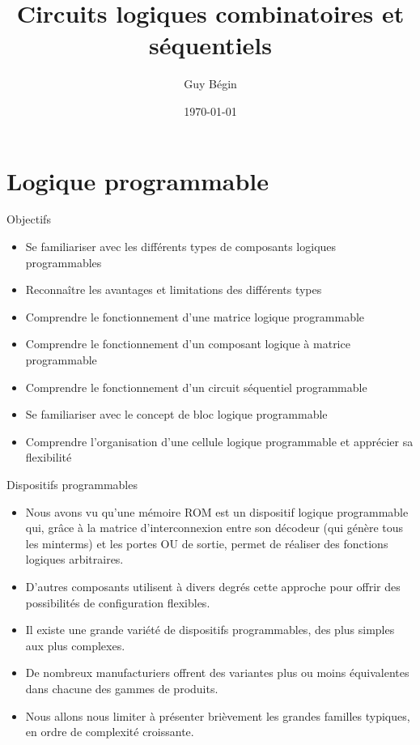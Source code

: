 \documentclass[presentation]{beamer}
\author{Guy Bégin}
\date{\today}
\title{Circuits logiques combinatoires et séquentiels}
\begin{document}
\maketitle

\section{Logique programmable}
\label{sec:org7c1b3f8}
\begin{frame}[label={sec:org0f8d217}]{Objectifs}
\begin{itemize}
\item Se familiariser avec les différents types de composants logiques programmables
\item Reconnaître les avantages et limitations des différents types
\item Comprendre le fonctionnement d'une matrice logique programmable
\item Comprendre le fonctionnement d'un composant logique à matrice programmable
\item Comprendre le fonctionnement d'un circuit séquentiel programmable
\item Se familiariser avec le concept de bloc logique programmable
\item Comprendre l'organisation d'une cellule logique programmable et
apprécier sa flexibilité
\end{itemize}
\end{frame}

\begin{frame}[label={sec:org2a99999}]{Dispositifs programmables}
\begin{itemize}
\item Nous avons vu qu'une mémoire ROM est un dispositif logique programmable qui, grâce à la matrice d'interconnexion entre son décodeur (qui génère tous les minterms) et les portes OU de sortie, permet de réaliser des fonctions logiques arbitraires.

\item D'autres composants utilisent à divers degrés cette approche pour offrir des possibilités de configuration flexibles.

\item Il existe une grande variété de dispositifs programmables, des plus simples aux plus complexes.

\item De nombreux manufacturiers offrent des variantes plus ou moins équivalentes dans chacune des gammes de produits.

\item Nous allons nous limiter à présenter brièvement les grandes familles typiques, en ordre de complexité croissante.
\end{itemize}
\end{frame}
\end{document}
